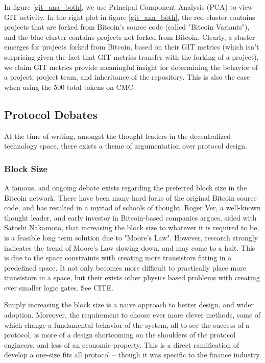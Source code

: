 \documentclass[12pt, titlepage, twocolumn]{report}
\begin{document}
In figure \ref{git_ana_both}, we use Principal Component Analysis (PCA) to view GIT activity. In the right plot in figure \ref{git_ana_both}, the red cluster contains projects that are forked from Bitcoin's source code (called "Bitcoin Variants"), and the blue cluster contains projects not forked from Bitcoin. Clearly, a cluster emerges for projects forked from Bitcoin, based on their GIT metrics (which isn't surprising given the fact that GIT metrics transfer with the forking of a project), we claim GIT metrics provide meaningful insight for determining the behavior of a project, project team, and inheritance of the repository. This is also the case when using the 500 total tokens on CMC.

\subsection{Protocol Debates}
At the time of writing, amongst the thought leaders in the decentralized technology space, there exists a theme of argumentation over protocol design. 

\subsubsection{Block Size}
A famous, and ongoing debate exists regarding the preferred block size in the Bitcoin network. There have been many hard forks of the original Bitcoin source code, and has resulted in a myriad of schools of thought. Roger Ver, a well-known thought leader, and early investor in Bitcoin-based companies argues, sided with Satoshi Nakamoto, that increasing the block size to whatever it is required to be, is a feasible long term solution due to "Moore's Law". However, research strongly indicates the trend of Moore's Law slowing down, and may come to a halt. This is due to the space constraints with creating more transistors fitting in a predefined space. It not only becomes more difficult to practically place more transistors in a space, but their exists other physics based problems with creating ever smaller logic gates. See CITE. 

Simply increasing the block size is a naive approach to better design, and wider adoption. Moreover, the requirement to choose ever more clever methods, some of which change a fundamental behavior of the system, all to see the success of a protocol, is more of a design shortcoming on the shoulders of the protocol engineers, and less of an economic property. This is a direct ramification of develop a one-size fits all protocol -- though it was specific to the finance industry. 
\end{document}
